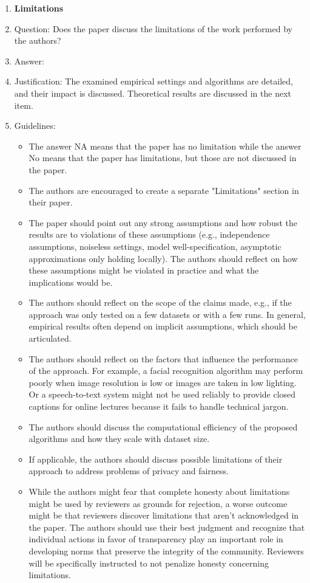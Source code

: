\documentclass{article}
\theoremstyle{plain}
\theoremstyle{definition}
\theoremstyle{remark}
\begin{document}
\begin{enumerate}
\item {\bf Limitations}
    \item[] Question: Does the paper discuss the limitations of the work performed by the authors?
    \item[] Answer: \answerYes{} %
    \item[] Justification: The examined empirical settings and algorithms are detailed, and their impact is discussed. Theoretical results are discussed in the next item.
    \item[] Guidelines:
    \begin{itemize}
        \item The answer NA means that the paper has no limitation while the answer No means that the paper has limitations, but those are not discussed in the paper. 
        \item The authors are encouraged to create a separate "Limitations" section in their paper.
        \item The paper should point out any strong assumptions and how robust the results are to violations of these assumptions (e.g., independence assumptions, noiseless settings, model well-specification, asymptotic approximations only holding locally). The authors should reflect on how these assumptions might be violated in practice and what the implications would be.
        \item The authors should reflect on the scope of the claims made, e.g., if the approach was only tested on a few datasets or with a few runs. In general, empirical results often depend on implicit assumptions, which should be articulated.
        \item The authors should reflect on the factors that influence the performance of the approach. For example, a facial recognition algorithm may perform poorly when image resolution is low or images are taken in low lighting. Or a speech-to-text system might not be used reliably to provide closed captions for online lectures because it fails to handle technical jargon.
        \item The authors should discuss the computational efficiency of the proposed algorithms and how they scale with dataset size.
        \item If applicable, the authors should discuss possible limitations of their approach to address problems of privacy and fairness.
        \item While the authors might fear that complete honesty about limitations might be used by reviewers as grounds for rejection, a worse outcome might be that reviewers discover limitations that aren't acknowledged in the paper. The authors should use their best judgment and recognize that individual actions in favor of transparency play an important role in developing norms that preserve the integrity of the community. Reviewers will be specifically instructed to not penalize honesty concerning limitations.
    \end{itemize}


\end{enumerate}
\end{document}
